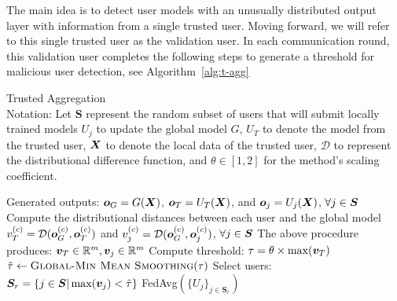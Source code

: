 \documentclass{article} %
\begin{document}
The main idea is to detect user models with an unusually distributed output layer with information from a single trusted user. Moving forward, we will refer to this single trusted user as the validation user. In each communication round, this validation user completes the following steps to generate a threshold for malicious user detection, see Algorithm~\ref{alg:t-agg}

\begin{algorithm}[H]
\caption{Trusted Aggregation \\ 
Notation: Let ${\bm S}$ represent the random subset of users that will submit locally trained models $U_j$ to update the global model $G$, $U_T$ to denote the model from the trusted user, ${\bm{X}}$ to denote the local data of the trusted user, $\mathcal{D}$ to represent the distributional difference function, and $\theta \in [1, 2]$ for the method's scaling coefficient.
}
\label{alg:t-agg}
\begin{algorithmic}[1]

        \State Generated outputs: ${\bm{o}}_G = G({\bm{X}})$, ${\bm{o}}_{T} = U_T({\bm{X}})$, and ${\bm{o}}_j = U_j({\bm{X}})$, $\forall j \in {\bm{S}}$
            \State Compute the distributional distances between each user and the global model
            \State \quad $v^{(c)}_T = \mathcal{D}({\bm{o}}^{(c)}_G, {\bm{o}}^{(c)}_T)$ and $v^{(c)}_{j} = \mathcal{D}({\bm{o}}^{(c)}_G, {\bm{o}}^{(c)}_{j})$, $\forall j \in {\bm{S}}$
        \EndFor
        \State The above procedure produces: ${\bm{v}}_T\in{\mathbb{R}}^m, {\bm{v}}_j\in{\mathbb{R}}^m$
        \State Compute threshold: $\tau = \theta \times\max ( {\bm{v}}_T )$
        \State  $\tilde{\tau} \gets \Call{Global-Min Mean Smoothing}{\tau}$  
        \State Select users: ${\bm{S}}_r = \{j \in {\bm{S}} | \max({\bm{v}}_{j}) < \tilde{\tau} \}$
        \State \Return FedAvg$(\{U_j\}_{j \in {\bm S}_r})$ 
    \EndProcedure
\end{algorithmic}
\end{algorithm}
\end{document}
